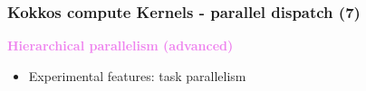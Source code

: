 \begin{frame}[fragile=singleslide]
  \frametitle{Kokkos compute Kernels - parallel dispatch (7)}
  
  {\Large \textcolor{violet}{\textbf{Hierarchical parallelism (advanced)}}}

  \begin{itemize}
  \item Experimental features: task parallelism
  \end{itemize}
  
\end{frame}
